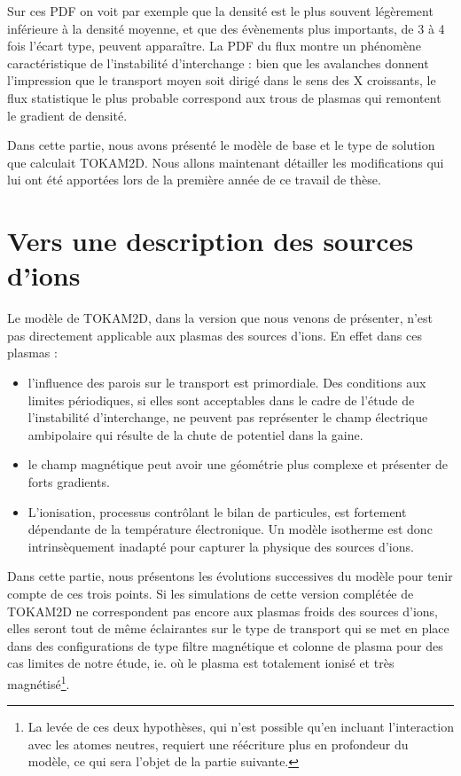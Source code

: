\begin{refsection}
Sur ces PDF on voit par exemple que la densité est le plus souvent
légèrement inférieure à la densité moyenne, et que des évènements plus
importants, de 3 à 4 fois l'écart type, peuvent apparaître. La PDF du flux
montre un phénomène caractéristique de l'instabilité d'interchange : bien que
les avalanches donnent l'impression que le transport moyen soit dirigé dans
le sens des X croissants, le flux statistique le plus probable correspond aux
trous de plasmas qui remontent le gradient de densité.

Dans cette partie, nous avons présenté le modèle de base et le type
de solution que calculait TOKAM2D. Nous allons maintenant détailler les
modifications qui lui ont été apportées lors de la première année de ce travail
de thèse.

\section{Vers une description des sources d'ions}

Le modèle de TOKAM2D, dans la version que nous venons de présenter, n'est pas
directement applicable aux plasmas des sources d'ions. En effet dans
ces plasmas :

\begin{itemize}
	\item l'influence des parois sur le transport est primordiale. Des conditions
	aux limites périodiques, si elles sont acceptables dans le cadre de l'étude de
	l'instabilité d'interchange, ne peuvent pas représenter le champ électrique
	ambipolaire qui résulte de la chute de potentiel dans la gaine.
	\item le champ magnétique peut avoir une géométrie plus complexe et présenter
	de forts gradients.
	\item L'ionisation, processus contrôlant le bilan de particules, est fortement
	dépendante de la température électronique. Un modèle isotherme est donc
	intrinsèquement inadapté pour capturer la physique des sources d'ions.
\end{itemize}

Dans cette partie, nous présentons les évolutions successives du modèle pour
tenir compte de ces trois points.
Si les simulations de cette version complétée de TOKAM2D ne correspondent pas
encore aux plasmas froids des sources d'ions, elles seront tout de même
éclairantes sur le type de
transport qui se met en place dans des configurations de type filtre magnétique
et colonne de plasma pour des cas limites de notre étude, ie. où le plasma
est totalement ionisé et très magnétisé\footnote{La levée de ces deux hypothèses, qui n'est possible qu'en incluant l'interaction avec les atomes neutres, requiert une réécriture
plus en profondeur du modèle, ce qui sera l'objet de la partie suivante.}.


\end{refsection}
